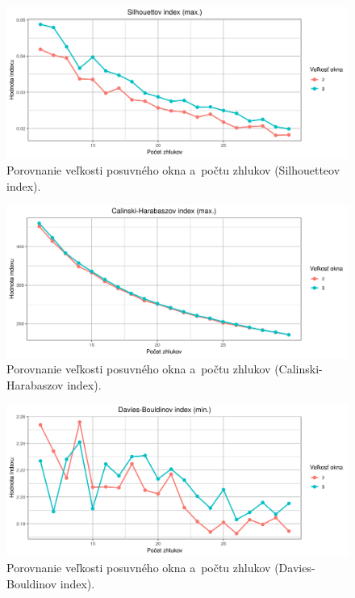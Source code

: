 \documentclass[a4paper,twoside,slovak,12pt,appendix]{article}
\begin{document}
\begin{appendices}
\begin{figure}[htbp]
  \centering
  \includegraphics[width=\textwidth]{cvi/dtw_basic_workdays_dense/201904291110-Sil-dtw_basic_workdays_dense.png}
  \caption{Porovnanie veľkosti posuvného okna a~počtu zhlukov (Silhouetteov index).}
\end{figure}
\begin{figure}[htbp]
  \centering
  \includegraphics[width=\textwidth]{cvi/dtw_basic_workdays_dense/201904291110-CH-dtw_basic_workdays_dense.png}
  \caption{Porovnanie veľkosti posuvného okna a~počtu zhlukov (Calinski-Harabaszov index).}
\end{figure}
\begin{figure}[htbp]
  \centering
  \includegraphics[width=\textwidth]{cvi/dtw_basic_workdays_dense/201904291110-DB-dtw_basic_workdays_dense.png}
  \caption{Porovnanie veľkosti posuvného okna a~počtu zhlukov (Davies-Bouldinov index).}

\end{figure}
\end{appendices}
\end{document}

